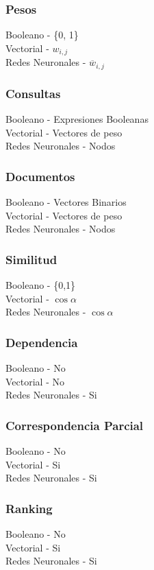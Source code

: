\documentclass{llncs}
\begin{document}
\begin{multicols}{2}[]
\subsubsection{Pesos}
Booleano - \{0, 1\} \\
Vectorial - $w_{i,j}$ \\
Redes Neuronales - $\overline{w}_{i, j}$

\subsubsection{Consultas}
Booleano -  Expresiones Booleanas \\
Vectorial - Vectores de peso \\
Redes Neuronales - Nodos

\subsubsection{Documentos}
Booleano -  Vectores Binarios \\
Vectorial - Vectores de peso \\
Redes Neuronales - Nodos

\subsubsection{Similitud}
Booleano -  \{0,1\} \\
Vectorial - $\cos{\alpha}$ \\
Redes Neuronales - $\cos{\alpha}$

\subsubsection{Dependencia}
Booleano -  No \\
Vectorial - No \\
Redes Neuronales - Si

\subsubsection{Correspondencia Parcial}
Booleano -  No \\
Vectorial - Si \\
Redes Neuronales - Si

\subsubsection{Ranking}
Booleano -  No \\
Vectorial - Si \\
Redes Neuronales - Si


\end{multicols}
\end{document}
